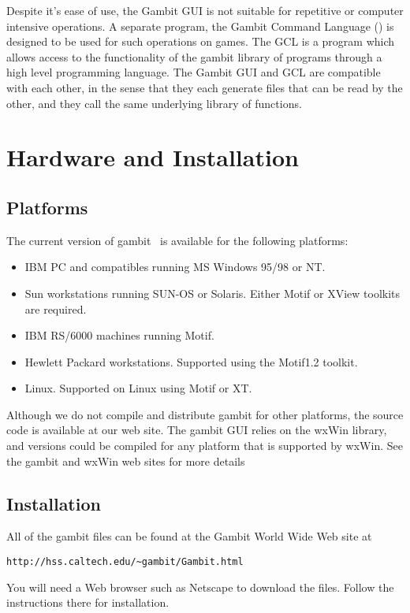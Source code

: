 Despite it's ease of use, the Gambit GUI is not suitable for repetitive or
computer intensive  operations.  A separate program, the Gambit Command
Language () is designed to be used for such operations 
on games.  The
GCL is a program which allows access to the functionality of the gambit
library of programs through a high level programming language.  The
Gambit GUI and GCL  are compatible with each other, in the sense that they
each generate files that can be read by the other, and they call the same
underlying library of functions.


\chapter{Hardware and Installation}
\section{Platforms}
The current version of gambit \ is available for the
 following platforms:  
\begin{itemize}
\item IBM PC and compatibles running MS Windows 95/98 or NT.
\item Sun workstations running
SUN-OS or Solaris.  Either Motif or XView toolkits are required.
\item IBM RS/6000 machines running Motif.
\item Hewlett Packard workstations.  Supported using the Motif1.2 toolkit.
\item Linux.  Supported on Linux using Motif or XT. 
\end{itemize}

Although we do not compile and distribute gambit for other platforms, the
source code is available at our web site.  The gambit GUI relies on the 
wxWin library, and versions could be compiled for
any platform that is supported by wxWin.  See the gambit and wxWin web sites 
for more details

\section{Installation}
All of the gambit files can be found at the Gambit World Wide Web site
at 

\begin{verbatim}
http://hss.caltech.edu/~gambit/Gambit.html
\end{verbatim}

You will need a Web browser such as Netscape to download the files.  Follow the 
instructions there for installation.  
 
